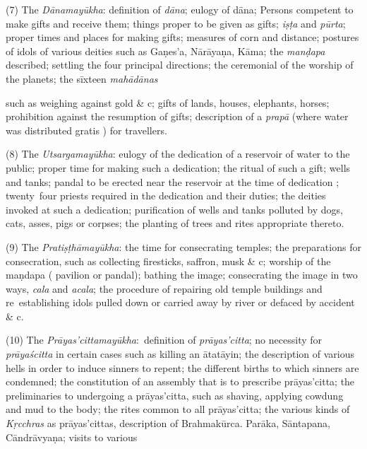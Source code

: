 \documentclass[11pt, openany]{book}
\begin{document}
(7) The \emph{\en Dānamayūkha}: definition of \emph{\en dāna}; eulogy of dāna; Persons competent to make gifts and receive them; things proper to be given as gifts; \emph{\en iṣṭa} and \emph{\en pūrta}; proper times and places for making gifts; measures of corn and distance; postures of idols of various deities such as Gaṇes'a, Nārāyaṇa, Kāma; the \emph{\en manḍapa} described; settling the four principal directions; the ceremonial of the worship of the planets; the sīxteen \emph{\en mahādānas}

\newpage

\noindent
such as weighing against gold \& c; gifts of lands, houses, elephants, horses; prohibition against the resumption of gifts; description of a \emph{\en prapā} (where water was distributed gratis ) for travellers.

(8) The \emph{\en Utsargamayūkha}: eulogy of the dedication of a reservoir of water to the public; proper time for making such a dedication; the ritual of such a gift; wells and tanks; pandal to be erected near the reservoir at the time of dedication ; twenty\textendash\ four priests required in the dedication and their duties; the deities invoked at such a dedication; purification of wells and tanks polluted by dogs, cats, asses, pigs or corpses; the planting of trees and rites appropriate thereto.

(9) The \emph{\en Pratiṣṭhāmayūkha}: the time for consecrating temples; the preparations for consecration, such as collecting firesticks, saffron, musk \& c; worship of the maṇdapa ( pavilion or pandal); bathing the image; consecrating the image in two ways, \emph{\en cala} and \emph{\en acala}; the procedure of repairing old temple buildings and re\textendash\ establishing idols pulled down or carried away by river or defaced by accident \& c.

(10) The \emph{\en Prāyas'cittamayūkha}:\textendash\ definition of \emph{\en prāyas'citta}; no necessity for \emph{\en prāyaścitta} in certain cases such as killing an ātatāyin; the description of various hells in order to induce sinners to repent; the different births to which sinners are condemned; the constitution of an assembly that is to prescribe prāyas'citta; the preliminaries to undergoing a prāyas'citta, such as shaving, applying cowdung and mud to the body; the rites common to all prāyas'citta; the various kinds of \emph{\en Kṛcchras} as prāyas'cittas, description of Brahmakūrca. Parāka, Sāntapana, Cāndrāvyaṇa; visits to various
\end{document}
